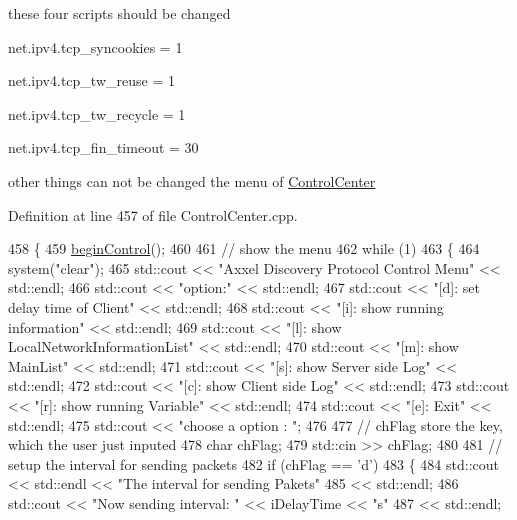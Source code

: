 these four scripts should be changed

net.\-ipv4.\-tcp\-\_\-syncookies = 1

net.\-ipv4.\-tcp\-\_\-tw\-\_\-reuse = 1

net.\-ipv4.\-tcp\-\_\-tw\-\_\-recycle = 1

net.\-ipv4.\-tcp\-\_\-fin\-\_\-timeout = 30

other things can not be changed the menu of \hyperlink{classControlCenter}{Control\-Center} 

Definition at line 457 of file Control\-Center.\-cpp.


\begin{DoxyCode}
458 \{
459     \hyperlink{classControlCenter_a704ca612d363de83423ad11379520bec}{beginControl}();
460 
461     \textcolor{comment}{// show the menu}
462     \textcolor{keywordflow}{while} (1)
463     \{
464         system(\textcolor{stringliteral}{"clear"});
465         std::cout << \textcolor{stringliteral}{"Axxel Discovery Protocol Control Menu"} << std::endl;
466         std::cout << \textcolor{stringliteral}{"option:"} << std::endl;
467         std::cout << \textcolor{stringliteral}{"[d]: set delay time of Client"} << std::endl;
468         std::cout << \textcolor{stringliteral}{"[i]: show running information"} << std::endl;
469         std::cout << \textcolor{stringliteral}{"[l]: show LocalNetworkInformationList"} << std::endl;
470         std::cout << \textcolor{stringliteral}{"[m]: show MainList"} << std::endl;
471         std::cout << \textcolor{stringliteral}{"[s]: show Server side Log"} << std::endl;
472         std::cout << \textcolor{stringliteral}{"[c]: show Client side Log"} << std::endl;
473         std::cout << \textcolor{stringliteral}{"[r]: show running Variable"} << std::endl;
474         std::cout << \textcolor{stringliteral}{"[e]: Exit"} << std::endl;
475         std::cout << \textcolor{stringliteral}{"choose a option :  "};
476 
477         \textcolor{comment}{// chFlag store the key, which the user just inputed}
478         \textcolor{keywordtype}{char} chFlag;
479         std::cin >> chFlag;
480 
481         \textcolor{comment}{// setup the interval for sending packets}
482         \textcolor{keywordflow}{if} (chFlag == \textcolor{charliteral}{'d'})
483         \{
484             std::cout << std::endl << \textcolor{stringliteral}{"The interval for sending Pakets"}
485                     << std::endl;
486             std::cout << \textcolor{stringliteral}{"Now sending interval: "} << iDelayTime << \textcolor{stringliteral}{"s"}
487                     << std::endl;

\end{DoxyCode}
